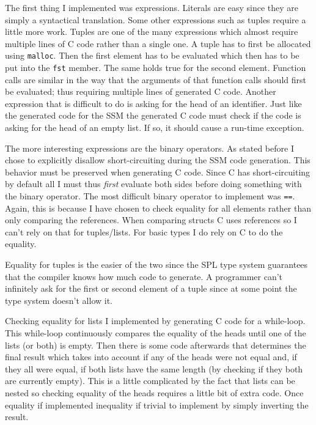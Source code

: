 \documentclass{article}
\begin{document}
The first thing I implemented was expressions. Literals are easy since they are simply a syntactical translation. Some other expressions such as tuples require a little more work. Tuples are one of the many expressions which almost require multiple lines of C code rather than a single one. A tuple has to first be allocated using \texttt{malloc}. Then the first element has to be evaluated which then has to be put into the \texttt{fst} member. The same holds true for the second element. Function calls are similar in the way that the arguments of that function calls should first be evaluated; thus requiring multiple lines of generated C code. Another expression that is difficult to do is asking for the head of an identifier. Just like the generated code for the SSM the generated C code must check if the code is asking for the head of an empty list. If so, it should cause a run-time exception.

The more interesting expressions are the binary operators. As stated before I chose to explicitly disallow short-circuiting during the SSM code generation. This behavior must be preserved when generating C code. Since C has short-circuiting by default all I must thus \textit{first} evaluate both sides before doing something with the binary operator. The most difficult binary operator to implement was \texttt{==}. Again, this is because I have chosen to check equality for all elements rather than only comparing the references. When comparing structs C uses references so I can't rely on that for tuples/lists. For basic types I do rely on C to do the equality.

Equality for tuples is the easier of the two since the SPL type system guarantees that the compiler knows how much code to generate. A programmer can't infinitely ask for the first or second element of a tuple since at some point the type system doesn't allow it.

Checking equality for lists I implemented by generating C code for a while-loop. This while-loop continuously compares the equality of the heads until one of the lists (or both) is empty. Then there is some code afterwards that determines the final result which takes into account if any of the heads were not equal and, if they all were equal, if both lists have the same length (by checking if they both are currently empty). This is a little complicated by the fact that lists can be nested so checking equality of the heads requires a little bit of extra code. Once equality if implemented inequality if trivial to implement by simply inverting the result.
\end{document}
